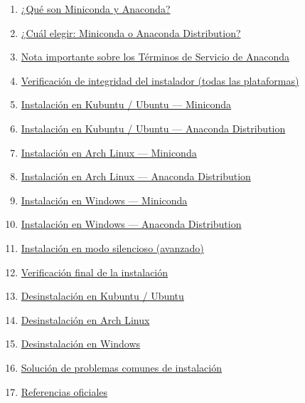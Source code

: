 \documentclass[
  doc,
  floatsintext,
  longtable,
  a4paper,
  nolmodern,
  notxfonts,
  notimes,
  12pt,
  colorlinks=true,linkcolor=blue,citecolor=blue,urlcolor=blue]{apa7}
\providecommand{\tightlist}{%
  \setlength{\itemsep}{0pt}\setlength{\parskip}{0pt}}
\begin{document}
\begin{enumerate}
\def\labelenumi{\arabic{enumi}.}
\tightlist
\item
  \hyperref[1-quuxe9-son-miniconda-y-anaconda]{¿Qué son Miniconda y
  Anaconda?}
\item
  \hyperref[2-cuuxe1l-elegir-miniconda-o-anaconda-distribution]{¿Cuál
  elegir: Miniconda o Anaconda Distribution?}
\item
  \hyperref[3-nota-importante-sobre-los-tuxe9rminos-de-servicio-de-anaconda]{Nota
  importante sobre los Términos de Servicio de Anaconda}
\item
  \hyperref[4-verificaciuxf3n-de-integridad-del-instalador-todas-las-plataformas]{Verificación
  de integridad del instalador (todas las plataformas)}
\item
  \hyperref[5-instalaciuxf3n-en-kubuntu--ubuntu--miniconda]{Instalación
  en Kubuntu / Ubuntu --- Miniconda}
\item
  \hyperref[6-instalaciuxf3n-en-kubuntu--ubuntu--anaconda-distribution]{Instalación
  en Kubuntu / Ubuntu --- Anaconda Distribution}
\item
  \hyperref[7-instalaciuxf3n-en-arch-linux--miniconda]{Instalación en
  Arch Linux --- Miniconda}
\item
  \hyperref[8-instalaciuxf3n-en-arch-linux--anaconda-distribution]{Instalación
  en Arch Linux --- Anaconda Distribution}
\item
  \hyperref[9-instalaciuxf3n-en-windows--miniconda]{Instalación en
  Windows --- Miniconda}
\item
  \hyperref[10-instalaciuxf3n-en-windows--anaconda-distribution]{Instalación
  en Windows --- Anaconda Distribution}
\item
  \hyperref[11-instalaciuxf3n-en-modo-silencioso-avanzado]{Instalación
  en modo silencioso (avanzado)}
\item
  \hyperref[12-verificaciuxf3n-final-de-la-instalaciuxf3n]{Verificación
  final de la instalación}
\item
  \hyperref[13-desinstalaciuxf3n-en-kubuntu--ubuntu]{Desinstalación en
  Kubuntu / Ubuntu}
\item
  \hyperref[14-desinstalaciuxf3n-en-arch-linux]{Desinstalación en Arch
  Linux}
\item
  \hyperref[15-desinstalaciuxf3n-en-windows]{Desinstalación en Windows}
\item
  \hyperref[16-soluciuxf3n-de-problemas-comunes-de-instalaciuxf3n]{Solución
  de problemas comunes de instalación}
\item
  \hyperref[17-referencias-oficiales]{Referencias oficiales}
\end{enumerate}
\end{document}
